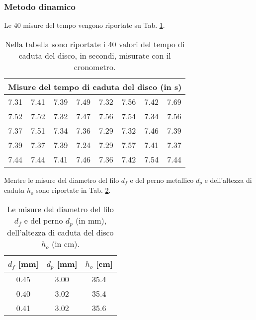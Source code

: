 \subsubsection*{Metodo dinamico}
Le 40 misure del tempo vengono riportate su Tab. \ref{tab_tempi_di_caduta}.
    \begin{table}[htp]
        \centering
        \begin{tabular}{||cccccccc||}
            \hline \hline
            \multicolumn{8}{||c||}{Misure del tempo di caduta del disco (in s)} \\
            \hline \hline
            7.31 & 7.41 & 7.39 & 7.49 & 7.32 & 7.56 & 7.42 & 7.69 \\
            7.52 & 7.52 & 7.32 & 7.47 & 7.56 & 7.54 & 7.34 & 7.56 \\
            7.37 & 7.51 & 7.34 & 7.36 & 7.29 & 7.32 & 7.46 & 7.39 \\
            7.39 & 7.37 & 7.39 & 7.24 & 7.29 & 7.57 & 7.41 & 7.37 \\
            7.44 & 7.44 & 7.41 & 7.46 & 7.36 & 7.42 & 7.54 & 7.44 \\
            \hline \hline 
        \end{tabular}
        \caption[\small Misure dei tempi di caduta.]{\small Nella tabella sono riportate i 40 valori del tempo di caduta del disco, in secondi, misurate con il cronometro.}
        \label{tab_tempi_di_caduta}
    \end{table}
Mentre le misure del diametro del filo $d_f$ e del perno metallico $d_p$ e dell'altezza di caduta $h_o$ sono riportate in Tab. \ref{altre_misure}.

    \begin{table}[htp]
        \centering
        \begin{tabular}{||c|c||c||}
            \hline \hline
            $d_f$ [mm] & $d_p$ [mm] & $h_o$ [cm] \\
            \hline
            0.45 & 3.00 & 35.4 \\
            0.40 & 3.02 & 35.4 \\
            0.41 & 3.02 & 35.6 \\
            \hline \hline 
        \end{tabular}
        \caption[\small Misure delle lunghezze per il metodo dinamico.]{\small Le misure del diametro del filo $d_f$ e del perno $d_p$ (in mm), dell'altezza di caduta del disco $h_o$ (in cm).}
        \label{altre_misure}
    \end{table}
\newpage